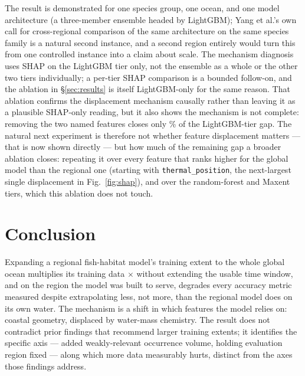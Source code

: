 The result is demonstrated for one species group, one ocean, and one model
architecture (a three-member ensemble headed by LightGBM); Yang et al.'s
\citep{yang2025} own call for cross-regional comparison of the same architecture on the same
species family is a natural second instance, and a second region entirely
would turn this from one controlled instance into a claim about scale. The
mechanism diagnosis uses SHAP on the LightGBM tier only, not the ensemble as
a whole or the other two tiers individually; a per-tier SHAP comparison is a
bounded follow-on, and the ablation in \S\ref{sec:results} is itself
LightGBM-only for the same reason. That ablation confirms the displacement
mechanism causally rather than leaving it as a plausible SHAP-only reading,
but it also shows the mechanism is not complete: removing the two named
features closes only \AblGapClosedPct{}\% of the LightGBM-tier gap. The
natural next experiment is therefore not whether feature displacement
matters --- that is now shown directly --- but how much of the remaining gap
a broader ablation closes: repeating it over every feature that ranks
higher for the global model than the regional one (starting with
\texttt{thermal\_position}, the next-largest single displacement in
Fig.~\ref{fig:shap}), and over the random-forest and Maxent tiers, which
this ablation does not touch.

\section{Conclusion}

Expanding a regional fish-habitat model's training extent to the whole global
ocean multiplies its training data \DataMultiple{}$\times$ without extending
the usable time window, and on the region the model was built to serve,
degrades every accuracy metric measured despite extrapolating less, not more,
than the regional model does on its own water. The mechanism is a shift in
which features the model relies on: coastal geometry, displaced by water-mass
chemistry. The result does not contradict prior findings that recommend
larger training extents; it identifies the specific axis --- added
weakly-relevant occurrence volume, holding evaluation region fixed --- along
which more data measurably hurts, distinct from the axes those findings
address.

